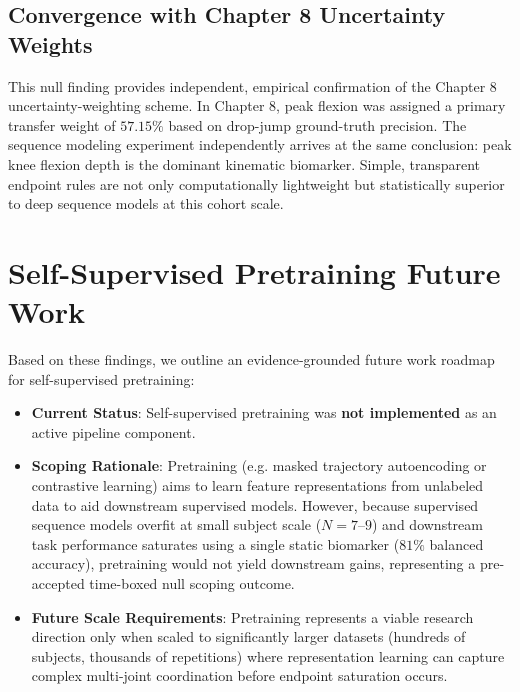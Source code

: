 \subsection{Convergence with Chapter 8 Uncertainty Weights}
\label{sec:13-4-2-convergence-with-chapter-8-uncertainty-weights}

This null finding provides independent, empirical confirmation of the Chapter 8 uncertainty-weighting scheme. In Chapter 8, peak flexion was assigned a primary transfer weight of \textbf{$57.15\%$} based on drop-jump ground-truth precision. The sequence modeling experiment independently arrives at the same conclusion: peak knee flexion depth is the dominant kinematic biomarker. Simple, transparent endpoint rules are not only computationally lightweight but statistically superior to deep sequence models at this cohort scale.



\section{Self-Supervised Pretraining Future Work}
\label{sec:13-5-self-supervised-pretraining-future-work}


Based on these findings, we outline an evidence-grounded future work roadmap for self-supervised pretraining:
\begin{itemize}
  \item \textbf{Current Status}: Self-supervised pretraining was \textbf{not implemented} as an active pipeline component.
  \item \textbf{Scoping Rationale}: Pretraining (e.g. masked trajectory autoencoding or contrastive learning) aims to learn feature representations from unlabeled data to aid downstream supervised models. However, because supervised sequence models overfit at small subject scale ($N=7\text{--}9$) and downstream task performance saturates using a single static biomarker ($81\%$ balanced accuracy), pretraining would not yield downstream gains, representing a pre-accepted time-boxed null scoping outcome.
  \item \textbf{Future Scale Requirements}: Pretraining represents a viable research direction only when scaled to significantly larger datasets (hundreds of subjects, thousands of repetitions) where representation learning can capture complex multi-joint coordination before endpoint saturation occurs.
\end{itemize}



